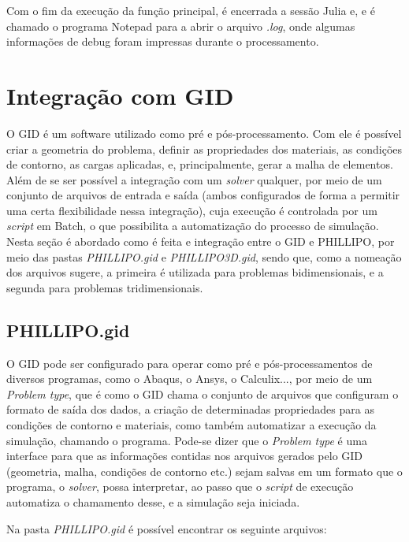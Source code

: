 Com o fim da execução da função principal, é encerrada a sessão Julia e, e é chamado o programa Notepad para a abrir o arquivo \emph{.log}, onde algumas informações de debug foram impressas durante o processamento. 

\section{Integração com GID}

O GID é um software utilizado como pré e pós-processamento. Com ele é possível criar a geometria do problema, definir as propriedades dos materiais, as condições de contorno, as cargas aplicadas, e, principalmente, gerar a malha de elementos. Além de se ser possível a integração com um \emph{solver} qualquer, por meio de um conjunto de arquivos de entrada e saída (ambos configurados de forma a permitir uma certa flexibilidade nessa integração), cuja execução é controlada por um \emph{script} em Batch, o que possibilita a automatização do processo de simulação. Nesta seção é abordado como é feita e integração entre o GID e PHILLIPO, por meio das pastas \emph{PHILLIPO.gid} e \emph{PHILLIPO3D.gid}, sendo que, como a nomeação dos arquivos sugere, a primeira é utilizada para problemas bidimensionais, e a segunda para problemas tridimensionais.

\subsection{PHILLIPO.gid}

O GID pode ser configurado para operar como pré e pós-processamentos de diversos programas, como o Abaqus, o Ansys, o Calculix..., por meio de um \emph{Problem type}, que é como o GID chama o conjunto de arquivos que configuram o formato de saída dos dados, a criação de determinadas propriedades para as condições de contorno e materiais, como também automatizar a execução da simulação, chamando o programa. Pode-se dizer que o \emph{Problem type} é uma interface para que as informações contidas nos arquivos gerados pelo GID (geometria, malha, condições de contorno etc.) sejam salvas em um formato que o programa, o \emph{solver}, possa interpretar, ao passo que o \emph{script} de execução automatiza o chamamento desse, e a simulação seja iniciada. 

Na pasta \emph{PHILLIPO.gid} é possível encontrar os seguinte arquivos:

